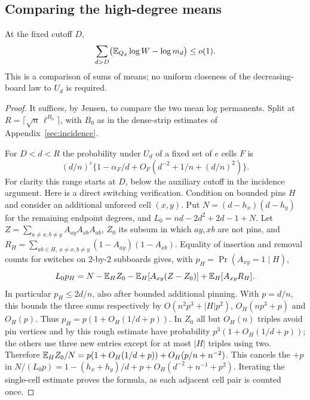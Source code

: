 \subsection{Comparing the high-degree means}
\begin{lemma}\label{lem:high-scalar}
At the fixed cutoff $D$,
\[
 \sum_{d>D}\bigl(\mathbb E_{Q_d}\log W-\log m_d\bigr)\le o(1).
\]
This is a comparison of sums of means; no uniform closeness of the decreasing-board law to $U_d$ is required.
\end{lemma}
\begin{proof}
It suffices, by Jensen, to compare the two mean log permanents. Split at $R=\lceil\sqrt n\,\ell^{B_0}\rceil$, with $B_0$ as in the dense-strip estimates of Appendix~\ref{sec:incidence}.

For $D<d<R$ the probability under $U_d$ of a fixed set of $e$ cells $F$ is
\[
 (d/n)^e\{1-\alpha_F/d+O_F(d^{-2}+1/n+(d/n)^2)\}.
\]
For clarity this range starts at $D$, below the auxiliary cutoff in the incidence argument. Here is a direct switching verification. Condition on bounded pins $H$ and consider an additional unforced cell $(x,y)$. Put $N=(d-h_x)(d-h_y)$ for the remaining endpoint degrees, and $L_0=nd-2d^2+2d-1+N$. Let $Z=\sum_{a\ne x,b\ne y}A_{ay}A_{xb}A_{ab}$, $Z_0$ its subsum in which $ay,xb$ are not pins, and $R_H=\sum_{ab\in H,\ a\ne x,b\ne y}(1-A_{ay})(1-A_{xb})$. Equality of insertion and removal counts for switches on $2$-by-$2$ subboards gives, with $p_H=\Pr(A_{xy}=1\mid H)$,
\[
 L_0p_H=N-\mathbb E_H Z_0-\mathbb E_H[A_{xy}(Z-Z_0)]+\mathbb E_H[A_{xy}R_H].
\]
In particular $p_H\le2d/n$, also after bounded additional pinning. With $p=d/n$, this bounds the three sums respectively by $O(n^2p^3+|H|p^2)$, $O_H(np^3+p)$ and $O_H(p)$. Thus $p_H=p(1+O_H(1/d+p))$. In $Z_0$ all but $O_H(n)$ triples avoid pin vertices and by this rough estimate have probability $p^3(1+O_H(1/d+p))$; the others use three new entries except for at most $|H|$ triples using two. Therefore $\mathbb E_H Z_0/N=p(1+O_H(1/d+p))+O_H(p/n+n^{-2})$. This cancels the $+p$ in $N/(L_0p)=1-(h_x+h_y)/d+p+O_H(d^{-2}+n^{-1}+p^2)$. Iterating the single-cell estimate proves the formula, as each adjacent cell pair is counted once.


\end{proof}
